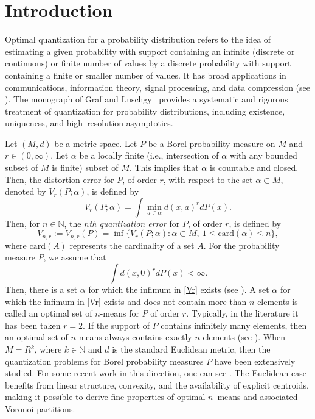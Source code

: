 \documentclass[12pt, reqno]{amsart}
\theoremstyle{plain}
\theoremstyle{definition}
\newcommand{\sci}{\subset}%
\newcommand{\ga}{\alpha}
\newcommand{\tit}{\textit}%
\newcommand{\D}[1]{\mathbb{#1}}%
\newcommand{\te}{\text}%
\begin{document}
\section{Introduction}

 Optimal quantization for a probability distribution refers to the idea of estimating a given probability with support containing an infinite (discrete or continuous) or finite number of values  by a discrete probability with support containing a finite or smaller number of values.   
It has broad applications in communications, information theory, signal processing, and data compression (see \cite{GarshoGray,  GregoryLinder2002, GrayNeuhoff1998, Pollard1982, Zador1982, Zamir2014}). The monograph of Graf and Luschgy~\cite{GrafLuschgy2000} provides a systematic and rigorous treatment of quantization for probability distributions, including existence, uniqueness, and high--resolution asymptotics.

Let $(M, d)$ be a metric space. 
Let $P$ be a Borel probability measure on $M$  and $r \in (0, \infty)$. Let $\ga$ be a locally finite (i.e., intersection of $\ga$ with any bounded subset of $M$ is finite) subset of $M$. This implies that $\ga$ is countable and closed. Then, the distortion error for $P$, of order $r$, with respect to the set $\ga \sci M$, denoted by $V_r(P; \ga)$, is defined by
\begin{equation*}
	V_r(P; \ga)= \int \mathop{\min}\limits_{a\in\ga} d(x, a)^r dP(x).
\end{equation*}
Then, for $n\in \mathbb{N}$, the \tit {$n$th quantization
	error} for $P$, of order $r$, is defined by
\begin{equation} \label{Vr} V_{n, r}:=V_{n, r}(P)=\inf \Big\{V_r(P; \ga) : \ga \sci M, ~ 1\leq  \text{card}(\ga) \leq n \Big\},\end{equation}
where $\te{card}(A)$ represents the cardinality of a set $A$. For the probability measure $P$, we assume that 
\begin{equation*} \label{M1eq}
	\int d(x, 0)^r dP(x)<\infty. 
\end{equation*}
Then, there is a set $\ga$ for which the infimum in \eqref{Vr} exists (see \cite{GrafLuschgy2000}). 
A set $\ga$ for which the infimum in \eqref{Vr} exists and does not contain more than $n$ elements is called an optimal set of $n$-means for $P$ of order $r$. Typically, in the literature it has been taken $r=2$. If the support of $P$ contains infinitely many elements, then an optimal set of $n$-means always contains exactly $n$ elements (see \cite {GrafLuschgy2000}). When $M=R^k$, where $k\in\D N$ and $d$ is the standard Euclidean metric, then the quantization problems for Borel probability measures $P$ have been extensively studied. 
For some recent work in this direction, one can see \cite{DFG, DettmannRoychowdhury, GrafLuschgy1997, GrafLuschgy2004, KNZ, PRRSS, Potzelberger, R1, R2, R3, R4, RS}. 
 The Euclidean case benefits from linear structure, convexity, and the availability of explicit centroids, making it possible to derive fine properties of optimal $n$--means and associated Voronoi partitions.
\end{document}
